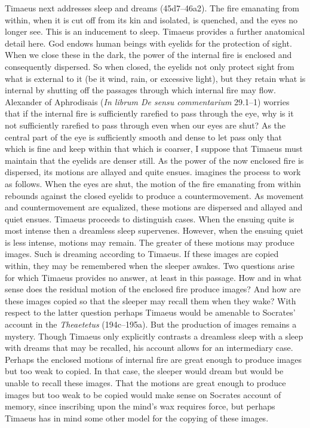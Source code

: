 Timaeus next addresses sleep and dreams (45d7--46a2). The fire emanating from within, when it is cut off from its kin and isolated, is quenched, and the eyes no longer see. This is an inducement to sleep. Timaeus provides a further anatomical detail here. God endows human beings with eyelids for the protection of sight. When we close these in the dark, the power of the internal fire is enclosed and consequently dispersed. So when closed, the eyelids not only protect sight from what is external to it (be it wind, rain, or excessive light), but they retain what is internal by shutting off the passages through which internal fire may flow. Alexander of Aphrodisais (\emph{In librum De sensu commentarium} 29.1--1) worries that if the internal fire is sufficiently rarefied to pass through the eye, why is it not sufficiently rarefied to pass through even when our eyes are shut? As the central part of the eye is sufficiently smooth and dense to let pass only that which is fine and keep within that which is coarser, I suppose that Timaeus must maintain that the eyelids are denser still. As the power of the now enclosed fire is dispersed, its motions are allayed and quite ensues. \citet[282--3]{Taylor:1928qb} imagines the process to work as follows. When the eyes are shut, the motion of the fire emanating from within rebounds against the closed eyelids to produce a countermovement. As movement and countermovement are equalized, these motions are dispersed and allayed and quiet ensues. Timaeus proceeds to distinguish cases. When the ensuing quite is most intense then a dreamless sleep supervenes. However, when the ensuing quiet is less intense, motions may remain. The greater of these motions may produce images. Such is dreaming according to Timaeus. If these images are copied within, they may be remembered when the sleeper awakes. Two questions arise for which Timaeus provides no answer, at least in this passage. How and in what sense does the residual motion of the enclosed fire produce images? And how are these images copied so that the sleeper may recall them when they wake? With respect to the latter question perhaps Timaeus would be amenable to Socrates' account in the \emph{Theaetetus} (194c--195a). But the production of images remains a mystery. Though Timaeus only explicitly contrasts a dreamless sleep with a sleep with dreams that may be recalled, his account allows for an intermediary case. Perhaps the enclosed motions of internal fire are great enough to produce images but too weak to copied. In that case, the sleeper would dream but would be unable to recall these images. That the motions are great enough to produce images but too weak to be copied would make sense on Socrates account of memory, since inscribing upon the mind's wax requires force, but perhaps Timaeus has in mind some other model for the copying of these images. 

